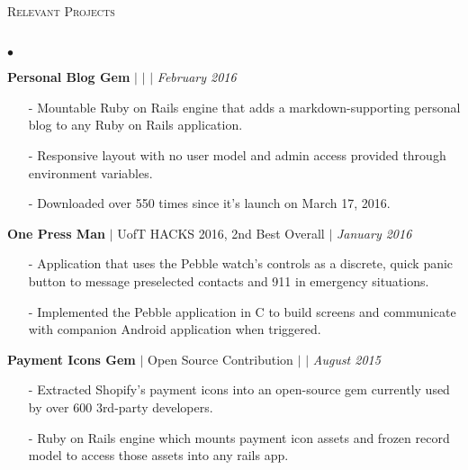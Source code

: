 \documentclass[10pt]{article}
\newcommand{\lineunder}{\vspace*{-8pt} \\ \hspace*{-18pt} \hrulefill \\}
\newcommand{\header}[1]{{\hspace*{-15pt}\vspace*{6pt} \textsc{#1}} \vspace*{-6pt} \lineunder }
\newenvironment{achievements}{\begin{list}{$\bullet$}{\topsep 0pt \itemsep -1.5pt \leftmargin 5pt}}{\vspace*{4pt}\end{list}}
\begin{document}
\vspace{10pt}

\header{\fontsize{11}{12}\selectfont Relevant Projects}
\begin{achievements}
\def\UrlFont{\em}
\item \textbf{Personal Blog Gem}  $|$  \href{https://github.com/nakulpathak3/personal-blog-gem}{\faGithub}   $|$  \href{http://nakulpathak.com/blog}{\faExternalLink}  $|$  \href{http://rubygems.org/gems/personal_blog}{\faDiamond} \hfill \textit {February 2016}
\begin{itemize}
\item[-]Mountable Ruby on Rails engine that adds a markdown-supporting personal blog to any Ruby on Rails application.
\vspace{2pt}
\item[-]Responsive layout with no user model and admin access provided through environment variables.
\vspace{2pt}
\item[-]Downloaded over 550 times since it's launch on March 17, 2016.
\end{itemize}
\vspace{5pt}
\item \textbf{One Press Man} {$|$ \scriptsize UofT HACKS 2016, 2nd Best Overall} $|$  \href{https://github.com/adrianmachado/Onepressman}{\faGithub} \hfill \textit {January 2016}
\begin{itemize}
\item[-]Application that uses the Pebble watch's controls as a discrete, quick panic button to message preselected contacts and 911 in emergency situations.
\vspace{2pt}
\item[-]Implemented the Pebble application in C to build screens and communicate with companion Android application when triggered.
\end{itemize}
\vspace{5pt}
\item \textbf{Payment Icons Gem} {$|$ \scriptsize Open Source Contribution} $|$  \href{https://github.com/activemerchant/payment_icons}{\faGithub} $|$ \href{http://rubygems.org/gems/payment_icons}{\faDiamond} \hfill \textit {August 2015}
\begin{itemize}
\item[-]Extracted Shopify's payment icons into an open-source gem currently used by over 600 3rd-party developers.
\vspace{2pt}
\item[-]Ruby on Rails engine which mounts payment icon assets and frozen record model to access those assets into any rails app.

\end{itemize}
\end{achievements}
\end{document}
